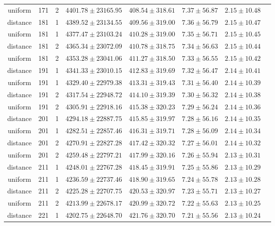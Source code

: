 \begin{tabular}{cccrrrrr}
uniform & 171 & 2 & $4401.78 \pm 23165.95$ & $408.54 \pm 318.61$ & $7.37 \pm 56.87$ & $2.15 \pm 10.48$\\
distance & 181 & 1 & $4389.52 \pm 23134.55$ & $409.56 \pm 319.00$ & $7.36 \pm 56.79$ & $2.15 \pm 10.47$\\
uniform & 181 & 1 & $4377.47 \pm 23103.24$ & $410.28 \pm 319.00$ & $7.35 \pm 56.71$ & $2.15 \pm 10.45$\\
distance & 181 & 2 & $4365.34 \pm 23072.09$ & $410.78 \pm 318.75$ & $7.34 \pm 56.63$ & $2.15 \pm 10.44$\\
uniform & 181 & 2 & $4353.28 \pm 23041.06$ & $411.27 \pm 318.50$ & $7.33 \pm 56.55$ & $2.15 \pm 10.42$\\
distance & 191 & 1 & $4341.33 \pm 23010.15$ & $412.83 \pm 319.69$ & $7.32 \pm 56.47$ & $2.14 \pm 10.41$\\
uniform & 191 & 1 & $4329.40 \pm 22979.38$ & $413.31 \pm 319.43$ & $7.31 \pm 56.40$ & $2.14 \pm 10.39$\\
distance & 191 & 2 & $4317.54 \pm 22948.72$ & $414.10 \pm 319.39$ & $7.30 \pm 56.32$ & $2.14 \pm 10.38$\\
uniform & 191 & 2 & $4305.91 \pm 22918.16$ & $415.38 \pm 320.23$ & $7.29 \pm 56.24$ & $2.14 \pm 10.36$\\
distance & 201 & 1 & $4294.18 \pm 22887.75$ & $415.85 \pm 319.97$ & $7.28 \pm 56.16$ & $2.14 \pm 10.35$\\
uniform & 201 & 1 & $4282.51 \pm 22857.46$ & $416.31 \pm 319.71$ & $7.28 \pm 56.09$ & $2.14 \pm 10.34$\\
distance & 201 & 2 & $4270.91 \pm 22827.28$ & $417.42 \pm 320.32$ & $7.27 \pm 56.01$ & $2.14 \pm 10.32$\\
uniform & 201 & 2 & $4259.48 \pm 22797.21$ & $417.99 \pm 320.16$ & $7.26 \pm 55.94$ & $2.13 \pm 10.31$\\
distance & 211 & 1 & $4248.01 \pm 22767.28$ & $418.45 \pm 319.91$ & $7.25 \pm 55.86$ & $2.13 \pm 10.29$\\
uniform & 211 & 1 & $4236.59 \pm 22737.46$ & $418.90 \pm 319.65$ & $7.24 \pm 55.78$ & $2.13 \pm 10.28$\\
distance & 211 & 2 & $4225.28 \pm 22707.75$ & $420.53 \pm 320.97$ & $7.23 \pm 55.71$ & $2.13 \pm 10.27$\\
uniform & 211 & 2 & $4213.99 \pm 22678.17$ & $420.99 \pm 320.72$ & $7.22 \pm 55.63$ & $2.13 \pm 10.25$\\
distance & 221 & 1 & $4202.75 \pm 22648.70$ & $421.76 \pm 320.70$ & $7.21 \pm 55.56$ & $2.13 \pm 10.24$\\

\end{tabular}
